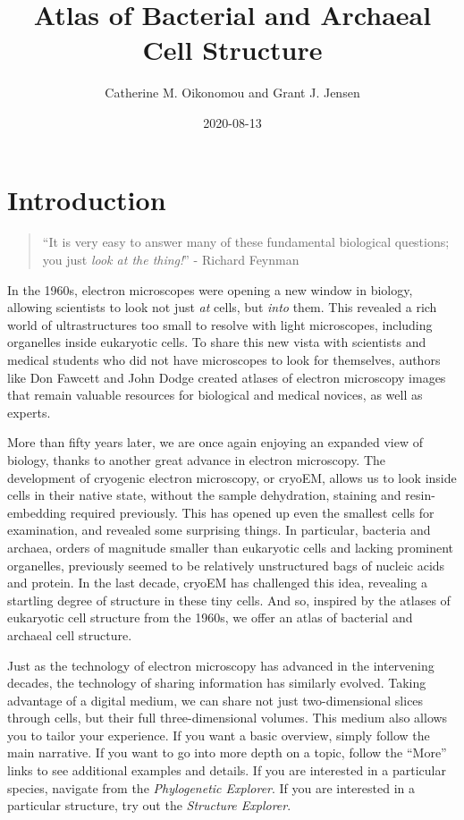 \documentclass[]{tufte-book}
\title{Atlas of Bacterial and Archaeal Cell Structure}
\author{Catherine M. Oikonomou and Grant J. Jensen}
\date{2020-08-13}
\begin{document}
\maketitle



{
\setcounter{tocdepth}{1}
\tableofcontents
}

\chapter*{Introduction}\label{introduction}

\begin{quote}
``It is very easy to answer many of these fundamental biological
questions; you just \emph{look at the thing!}'' - Richard Feynman
\citep{feynman1960}
\end{quote}

In the 1960s, electron microscopes were opening a new window in biology,
allowing scientists to look not just \emph{at} cells, but \emph{into}
them. This revealed a rich world of ultrastructures too small to resolve
with light microscopes, including organelles inside eukaryotic cells. To
share this new vista with scientists and medical students who did not
have microscopes to look for themselves, authors like Don Fawcett
\citep{fawcett1966} and John Dodge \citep{dodge1968} created atlases of
electron microscopy images that remain valuable resources for biological
and medical novices, as well as experts.

More than fifty years later, we are once again enjoying an expanded view
of biology, thanks to another great advance in electron microscopy. The
development of cryogenic electron microscopy, or cryoEM, allows us to
look inside cells in their native state, without the sample dehydration,
staining and resin-embedding required previously. This has opened up
even the smallest cells for examination, and revealed some surprising
things. In particular, bacteria and archaea, orders of magnitude smaller
than eukaryotic cells and lacking prominent organelles, previously
seemed to be relatively unstructured bags of nucleic acids and protein.
In the last decade, cryoEM has challenged this idea, revealing a
startling degree of structure in these tiny cells. And so, inspired by
the atlases of eukaryotic cell structure from the 1960s, we offer an
atlas of bacterial and archaeal cell structure.

Just as the technology of electron microscopy has advanced in the
intervening decades, the technology of sharing information has similarly
evolved. Taking advantage of a digital medium, we can share not just
two-dimensional slices through cells, but their full three-dimensional
volumes. This medium also allows you to tailor your experience. If you
want a basic overview, simply follow the main narrative. If you want to
go into more depth on a topic, follow the ``More'' links to see
additional examples and details. If you are interested in a particular
species, navigate from the \emph{Phylogenetic Explorer}. If you are
interested in a particular structure, try out the \emph{Structure
Explorer}.
\end{document}
